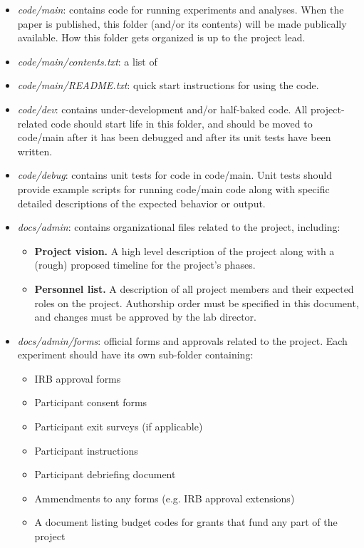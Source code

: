\documentclass{tufte-book} %
\begin{document}
\begin{itemize}
\item \textit{code/main}: contains code for running experiments and
  analyses.  When the paper is published, this folder (and/or its contents) will be made
  publically available.  How this folder gets organized is up to the
  project lead.
\item \textit{code/main/contents.txt}: a list of 
\item \textit{code/main/README.txt}: quick start instructions for
  using the code.
\item \textit{code/dev}: contains under-development and/or half-baked
  code.  All project-related code should start life in this folder,
  and should be moved to code/main after it has been debugged and
  after its unit tests have been written.
\item \textit{code/debug}: contains unit tests for code in code/main.
  Unit tests should provide example scripts for running code/main code
  along with specific detailed descriptions of the expected behavior
  or output.
\item \textit{docs/admin}: contains organizational files related to the
  project, including:
\begin{itemize}
\item \textbf{Project vision.}  A high level description of the
  project along with a (rough) proposed timeline for the project's
  phases.
\item \textbf{Personnel list.}  A description of all project members
  and their expected roles on the project.  Authorship order must be
  specified in this document, and changes must be approved by the lab
  director.
\end{itemize}
\item \textit{docs/admin/forms}: official forms and approvals related to
  the project.  Each experiment should have its own sub-folder
  containing:
\begin{itemize}
  \item IRB approval forms
  \item Participant consent forms
  \item Participant exit surveys (if applicable)
  \item Participant instructions
  \item Participant debriefing document
  \item Ammendments to any forms (e.g. IRB approval extensions)
  \item A document listing budget codes for grants that fund any part
    of the project  
\end{itemize}


\end{itemize}
\end{document}
